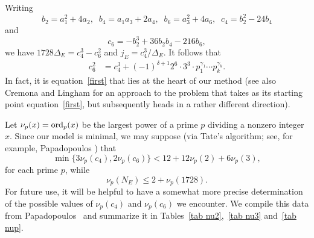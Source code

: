 Writing
$$
b_2 = a_1^2+4a_2, \; \; b_4 = a_1 a_3 + 2 a_4, \; \; 
b_6 = a_3^2+4a_6, \; \; 
c_4 = b_2^2-24 b_4 
$$
and
$$
c_6 = -b_2^3+ 36 b_2 b_4 -216 b_6,
$$
we have
$1728 \Delta_E = c_4^3-c_6^2$ and
$j_E = c_4^3/\Delta_E$.
It follows that
\begin{align} \label{first}
c_6^2 &= c_4^3 + (-1)^{\delta +1} 2^6 \cdot 3^3 \cdot p_1^{\gamma_1} \cdots p_k^{\gamma_k}.
\end{align}
In fact, it is equation~\eqref{first} that lies at the heart of our method (see also Cremona and 
Lingham \cite{CrLi} for an approach to the problem that takes as its starting point equation~\eqref{first}, but 
subsequently heads in a rather different direction).

Let $\nu_p(x) = \operatorname{ord}_p(x)$ be the largest power of a prime $p$ dividing a nonzero integer $x$. Since our model is minimal, we 
may suppose  (via Tate's algorithm; see, for example, Papadopoulos \cite{Pap}) that 
$$
\min \{ 3 \nu_p (c_4), 2 \nu_p (c_6) \} < 12 + 12 \nu_p(2) + 6 \nu_p(3),
$$
for each prime $p$, while
$$
\nu_p (N_E) \leq 2 + \nu_p (1728).
$$ 
For future use, it will be helpful to have a somewhat more precise determination of the possible 
values of $\nu_p(c_4)$ and $\nu_p(c_6)$ we encounter. We compile this data from Papadopoulos~\cite{Pap} and
summarize it in Tables~\ref{tab nu2},~\ref{tab nu3} and~\ref{tab nup}.

